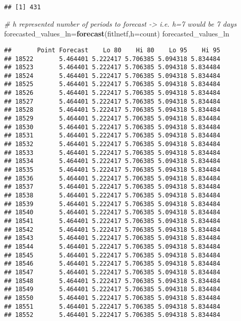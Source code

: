 \documentclass[
]{article}
\newenvironment{Shaded}{\begin{snugshade}}{\end{snugshade}}
\newcommand{\CommentTok}[1]{\textcolor[rgb]{0.56,0.35,0.01}{\textit{#1}}}
\newcommand{\DataTypeTok}[1]{\textcolor[rgb]{0.13,0.29,0.53}{#1}}
\newcommand{\KeywordTok}[1]{\textcolor[rgb]{0.13,0.29,0.53}{\textbf{#1}}}
\newcommand{\NormalTok}[1]{#1}
\begin{document}
\begin{verbatim}
## [1] 431
\end{verbatim}

\begin{Shaded}
\begin{Highlighting}[]
    \CommentTok{# h represented number of periods to forecast -> i.e. h=7 would be 7 days}
\NormalTok{      forecasted_values_ln=}\KeywordTok{forecast}\NormalTok{(fitlnetf,}\DataTypeTok{h=}\NormalTok{count)}
\NormalTok{      forecasted_values_ln}
\end{Highlighting}
\end{Shaded}

\begin{verbatim}
##       Point Forecast    Lo 80    Hi 80    Lo 95    Hi 95
## 18522       5.464401 5.222417 5.706385 5.094318 5.834484
## 18523       5.464401 5.222417 5.706385 5.094318 5.834484
## 18524       5.464401 5.222417 5.706385 5.094318 5.834484
## 18525       5.464401 5.222417 5.706385 5.094318 5.834484
## 18526       5.464401 5.222417 5.706385 5.094318 5.834484
## 18527       5.464401 5.222417 5.706385 5.094318 5.834484
## 18528       5.464401 5.222417 5.706385 5.094318 5.834484
## 18529       5.464401 5.222417 5.706385 5.094318 5.834484
## 18530       5.464401 5.222417 5.706385 5.094318 5.834484
## 18531       5.464401 5.222417 5.706385 5.094318 5.834484
## 18532       5.464401 5.222417 5.706385 5.094318 5.834484
## 18533       5.464401 5.222417 5.706385 5.094318 5.834484
## 18534       5.464401 5.222417 5.706385 5.094318 5.834484
## 18535       5.464401 5.222417 5.706385 5.094318 5.834484
## 18536       5.464401 5.222417 5.706385 5.094318 5.834484
## 18537       5.464401 5.222417 5.706385 5.094318 5.834484
## 18538       5.464401 5.222417 5.706385 5.094318 5.834484
## 18539       5.464401 5.222417 5.706385 5.094318 5.834484
## 18540       5.464401 5.222417 5.706385 5.094318 5.834484
## 18541       5.464401 5.222417 5.706385 5.094318 5.834484
## 18542       5.464401 5.222417 5.706385 5.094318 5.834484
## 18543       5.464401 5.222417 5.706385 5.094318 5.834484
## 18544       5.464401 5.222417 5.706385 5.094318 5.834484
## 18545       5.464401 5.222417 5.706385 5.094318 5.834484
## 18546       5.464401 5.222417 5.706385 5.094318 5.834484
## 18547       5.464401 5.222417 5.706385 5.094318 5.834484
## 18548       5.464401 5.222417 5.706385 5.094318 5.834484
## 18549       5.464401 5.222417 5.706385 5.094318 5.834484
## 18550       5.464401 5.222417 5.706385 5.094318 5.834484
## 18551       5.464401 5.222417 5.706385 5.094318 5.834484
## 18552       5.464401 5.222417 5.706385 5.094318 5.834484

\end{verbatim}
\end{document}
